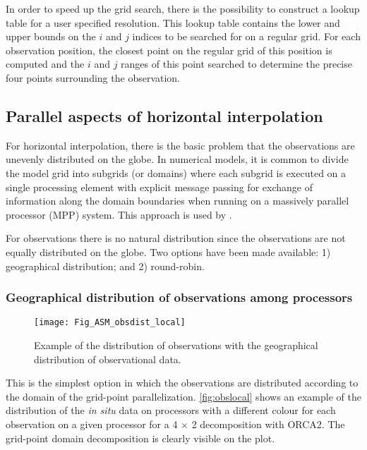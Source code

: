 \documentclass[../tex_main/NEMO_manual]{subfiles}
\begin{document}
In order to speed up the grid search, there is the possibility to construct 
a lookup table for a user specified resolution. This lookup
table contains the lower and upper bounds on the $i$ and $j$ indices
to be searched for on a regular grid. For each observation position,
the closest point on the regular grid of this position is computed and
the $i$ and $j$ ranges of this point searched to determine the precise
four points surrounding the observation. 

\subsection{Parallel aspects of horizontal interpolation}
\label{subsec:OBS_parallel}

For horizontal interpolation, there is the basic problem that the
observations are unevenly distributed on the globe. In numerical
models, it is common to divide the model grid into subgrids (or
domains) where each subgrid is executed on a single processing element
with explicit message passing for exchange of information along the
domain boundaries when running on a massively parallel processor (MPP)
system. This approach is used by \NEMO.

For observations there is no natural distribution since the
observations are not equally distributed on the globe. 
Two options have been made available: 1) geographical distribution;
and 2) round-robin.

\subsubsection{Geographical distribution of observations among processors}

\begin{figure}      \begin{center}
\texttt{[image: Fig\_ASM\_obsdist\_local]}
\caption{      \protect\label{fig:obslocal}
Example of the distribution of observations with the geographical distribution of observational data.} 
\end{center}      \end{figure}

This is the simplest option in which the observations are distributed according 
to the domain of the grid-point parallelization. \autoref{fig:obslocal}
shows an example of the distribution of the {\em in situ} data on processors 
with a different colour for each observation
on a given processor for a 4 $\times$ 2 decomposition with ORCA2. 
The grid-point domain decomposition is clearly visible on the plot.
\end{document}
